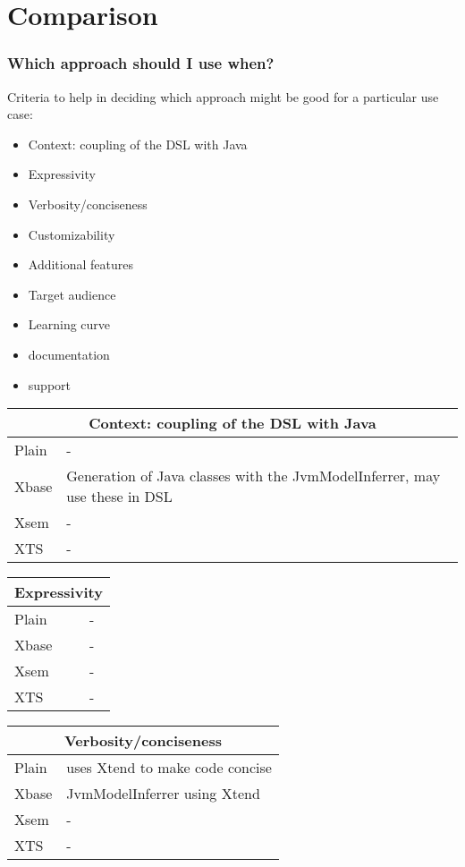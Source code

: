 \section{Comparison}

\begin{frame}
  \frametitle{Which approach should I use when?}
  
  Criteria to help in deciding which approach might be good for a particular use
  case:
  \begin{itemize}
    \item Context: coupling of the DSL with Java
    \item Expressivity
    \item Verbosity/conciseness
    \item Customizability
    \item Additional features
    \item Target audience
    \item Learning curve
    \item documentation
    \item support
  \end{itemize}
  
\begin{tabularx}{\linewidth}{ l   X }
\multicolumn{2}{c}{Context: coupling of the DSL with Java} \\ \hline
Plain & - \\
Xbase & Generation of Java classes with the JvmModelInferrer, may use these in
DSL \\
Xsem & - \\
XTS & - \\
\end{tabularx}

\begin{tabularx}{\linewidth}{ l   X }
\multicolumn{2}{c}{Expressivity} \\ \hline
Plain & - \\
Xbase & - \\
Xsem & - \\
XTS & - \\
\end{tabularx}

\begin{tabularx}{\linewidth}{ l   X }
\multicolumn{2}{c}{Verbosity/conciseness} \\ \hline
Plain & uses Xtend to make code concise \\
Xbase & JvmModelInferrer using Xtend \\
Xsem & - \\
XTS & - \\
\end{tabularx}


\end{frame}
